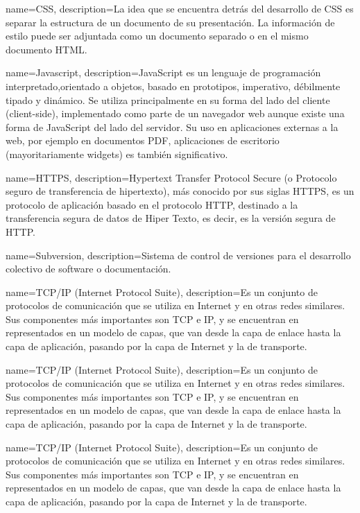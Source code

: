 {name=CSS,
 description={La idea que se encuentra detrás del desarrollo de CSS es separar la estructura de un documento de su presentación. La información de estilo puede ser adjuntada como un documento separado o en el mismo documento HTML.}
 }
 
{name=Javascript,
 description={JavaScript es un lenguaje de programación interpretado,orientado a objetos, basado en prototipos, imperativo, débilmente tipado y dinámico. Se utiliza principalmente en su forma del lado del cliente (client-side), implementado como parte de un navegador web aunque existe una forma de JavaScript del lado del servidor. Su uso en aplicaciones externas a la web, por ejemplo en documentos PDF, aplicaciones de escritorio (mayoritariamente widgets) es también significativo.}
 }
 
{name=HTTPS,
 description={Hypertext Transfer Protocol Secure (o Protocolo seguro de transferencia de hipertexto), más conocido por sus siglas HTTPS, es un protocolo de aplicación basado en el protocolo HTTP, destinado a la transferencia segura de datos de Hiper Texto, es decir, es la versión segura de HTTP.}
 }
 
 
 
{name=Subversion,
 description={Sistema de control de versiones para el desarrollo colectivo de software o documentación.}
 }
 
{name=TCP/IP (Internet Protocol Suite),
 description={Es un conjunto de protocolos de comunicación que se utiliza en Internet y en otras redes similares. Sus componentes más importantes son TCP e IP, y se encuentran en representados en un modelo de capas, que van desde la capa de enlace hasta la capa de aplicación, pasando por la capa de Internet y la de transporte.}
 }
 
{name=TCP/IP (Internet Protocol Suite),
 description={Es un conjunto de protocolos de comunicación que se utiliza en Internet y en otras redes similares. Sus componentes más importantes son TCP e IP, y se encuentran en representados en un modelo de capas, que van desde la capa de enlace hasta la capa de aplicación, pasando por la capa de Internet y la de transporte.}
 }
 
{name=TCP/IP (Internet Protocol Suite),
 description={Es un conjunto de protocolos de comunicación que se utiliza en Internet y en otras redes similares. Sus componentes más importantes son TCP e IP, y se encuentran en representados en un modelo de capas, que van desde la capa de enlace hasta la capa de aplicación, pasando por la capa de Internet y la de transporte.}
 }
 
